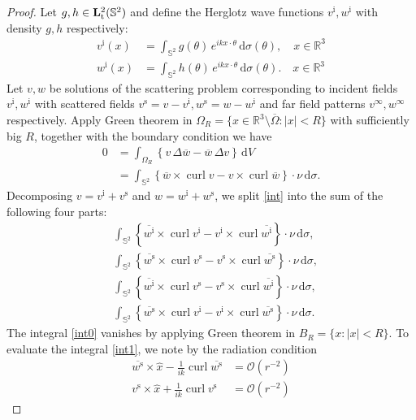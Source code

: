 \documentclass[a4paper,12pt]{article}
\theoremstyle{definition}
\newcommand\lTT{{\bf L}^2_\text{t}}
\newcommand\lTS{\lTT(\mathbb{S}^2)}
\newcommand\intbn[1]{\int_{\mathbb{S}^2}#1\,\text{d}\sigma}
\newcommand\intc[2][(\theta)]{\int_{\mathbb{S}^2}#2\,\text{d}\sigma#1}
\DeclareMathOperator\curl{curl}
\begin{document}
\begin{proof}
  Let $g, h\in\lTS$ and define the Herglotz wave functions $v^\text{i}, w^\text{i}$ with density $g, h$ respectively:
  \begin{align*}
    v^\text{i}(x)&=\intc{g(\theta)\,e^{i k x\cdot\theta}},\quad x\in\mathbb{R}^3\\
    w^\text{i}(x)&=\intc{h(\theta)\,e^{i k x\cdot\theta}}.\quad x\in\mathbb{R}^3 
  \end{align*}
  Let $v, w$ be solutions of the scattering problem corresponding to incident fields $v^\text{i}, w^\text{i}$ with scattered fields $v^\text{s}=v-v^\text{i}, w^\text{s}=w-w^\text{i}$ and far field patterns $v^\infty, w^\infty$ respectively. Apply Green theorem in $\Omega_R=\{x\in\mathbb{R}^3\setminus\overline{\Omega}: |x|<R\}$ with sufficiently big $R$, together with the boundary condition we have
  \begin{align}
    0 &= \int_{\Omega_R}\left\{v\,\Delta\overline{w}-\overline{w}\,\Delta v\right\}\,\text{d}V \\
    &= \intbn{\left\{\overline{w}\times\curl{v} - v\times\curl{\overline{w}}\right\}\cdot\nu}.\label{int}
  \end{align} 
  Decomposing $v=v^\text{i}+v^\text{s}$ and $w=w^\text{i}+w^\text{s}$, we split \eqref{int} into the sum of the following four parts:
  \begin{align}
    &\intbn{\left\{\overline{w^\text{i}}\times\curl{v^\text{i}} - v^\text{i}\times\curl{\overline{w^\text{i}}}\right\}\cdot\nu},\label{int0} \\
    &\intbn{\left\{\overline{w^\text{s}}\times\curl{v^\text{s}} - v^\text{s}\times\curl{\overline{w^\text{s}}}\right\}\cdot\nu},\label{int1} \\
    &\intbn{\left\{\overline{w^\text{i}}\times\curl{v^\text{s}} - v^\text{s}\times\curl{\overline{w^\text{i}}}\right\}\cdot\nu},\label{int2} \\
    &\intbn{\left\{\overline{w^\text{s}}\times\curl{v^\text{i}} - v^\text{i}\times\curl{\overline{w^\text{s}}}\right\}\cdot\nu}.\label{int3}
  \end{align}
  The integral \eqref{int0} vanishes by applying Green theorem in $B_R=\{x:|x|<R\}$. To evaluate the integral \eqref{int1}, we note by the radiation condition
  \begin{align}
    \overline{w^\text{s}}\times\hat{x} - \frac{1}{ik} \curl{\overline{w^\text{s}}} &= \mathcal{O}\left(r^{-2}\right) \\
    v^\text{s}\times\hat{x} + \frac{1}{ik} \curl{v^\text{s}} &= \mathcal{O}\left(r^{-2}\right) 

\end{align}
\end{proof}
\end{document}
